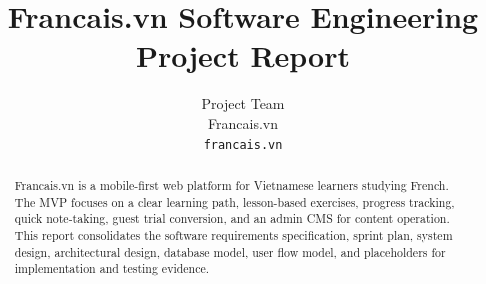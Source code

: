 \documentclass{article}
\title{Francais.vn Software Engineering Project Report}
\author{
  Project Team\\
  Francais.vn\\
  \texttt{francais.vn}
}
\begin{document}
\maketitle

\begin{abstract}
Francais.vn is a mobile-first web platform for Vietnamese learners studying French. The MVP focuses on a clear learning path, lesson-based exercises, progress tracking, quick note-taking, guest trial conversion, and an admin CMS for content operation. This report consolidates the software requirements specification, sprint plan, system design, architectural design, database model, user flow model, and placeholders for implementation and testing evidence.
\end{abstract}

\tableofcontents






\end{document}
